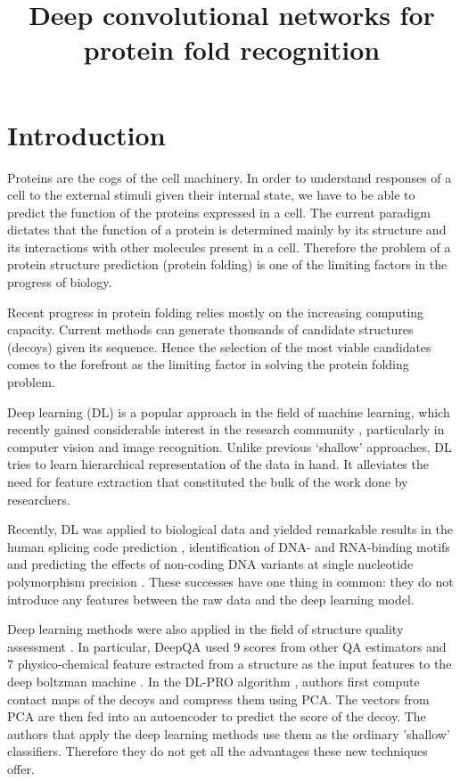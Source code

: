 \documentclass[a4paper,10pt]{article}
\title{Deep convolutional networks for protein fold recognition}
\author{}
\begin{document}
\maketitle

\begin{abstract}

\end{abstract}

\section{Introduction}
Proteins are the cogs of the cell machinery. In order to understand responses of a cell to the external stimuli given their internal state, we
have to be able to predict the function of the proteins expressed in a cell. The current paradigm dictates that the function of a protein is determined
mainly by its structure and its interactions with other molecules present in a cell. Therefore the problem of a protein structure prediction 
(protein folding) is one of the limiting factors in the progress of biology.

Recent progress in protein folding relies mostly on the increasing computing capacity. Current methods can generate thousands of 
candidate structures (decoys) given its sequence. Hence the selection of the most viable candidates comes to the forefront as the limiting 
factor in solving the protein folding problem. 

Deep learning (DL) is a popular  approach in the field of machine learning, which recently gained considerable interest in the research community \cite{lecun2015deep}, 
particularly in computer vision and image recognition. Unlike previous ‘shallow’ approaches, DL tries to learn hierarchical representation of the 
data in hand. It alleviates the need for feature extraction that constituted the bulk of the work done by researchers. 

Recently, DL was applied to biological data and yielded remarkable results in the human splicing code prediction \cite{xiong2015human}, 
identification of DNA- and RNA-binding  motifs \cite{alipanahi2015predicting} and predicting the effects of non-coding DNA variants at single nucleotide polymorphism 
precision \cite{zhou2015predicting}. These successes have one thing in common: they do not introduce any features between the raw data and the deep learning model. 

Deep learning methods were also applied in the field of structure quality assessment \cite{}. In particular, DeepQA \cite{} used 9 scores from other QA estimators and 
7 physico-chemical feature estracted from a structure as the input features to the deep boltzman machine \cite{}. In the DL-PRO algorithm \cite{}, authors first compute 
contact maps of the decoys and compress them using PCA. The vectors from PCA are then fed into an autoencoder to predict the score of the decoy. The authors that apply the 
deep learning methods use them as the ordinary 'shallow' classifiers. Therefore they do not get all the advantages these new techniques offer.
\end{document}
